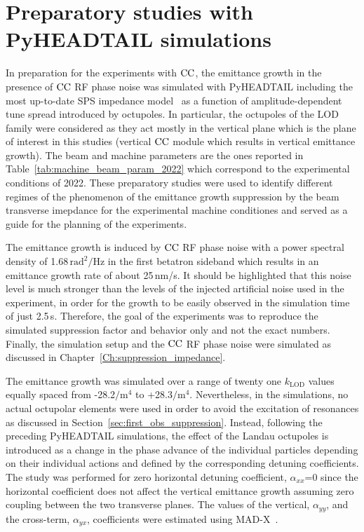 \section{Preparatory studies with PyHEADTAIL simulations}\label{sec:preparatory_studies_2022_cc}

In preparation for the experiments with ${\mathrm{CC}}$, the emittance growth in the presence of ${\mathrm{CC}}$ RF phase noise was simulated with PyHEADTAIL including the most up-to-date SPS impedance model~\cite{updated_sps_wakfields_model} as a function of amplitude-dependent tune spread introduced by octupoles. In particular, the octupoles of the LOD family were considered as they act mostly in the vertical plane which is the plane of interest in this studies (vertical ${\mathrm{CC}}$ module which results in vertical emittance growth). The beam and machine parameters are the ones reported in Table~\ref{tab:machine_beam_param_2022} which correspond to the experimental conditions of 2022. These preparatory studies were used to identify different regimes of the phenomenon of the emittance growth suppression by the beam transverse imepdance for the experimental machine conditiones and served as a guide for the planning of the experiments.

The emittance growth is induced by ${\mathrm{CC}}$ RF phase noise with a power spectral density of 1.68\,$\mathrm{rad^2/Hz}$ in the first betatron sideband which results in an emittance growth rate of about 25\,nm/s. It should be highlighted that this noise level is much stronger than the levels of the injected artificial noise used in the experiment, in order for the growth to be easily observed in the simulation time of just 2.5\,s. Therefore, the goal of the experiments was to reproduce the simulated suppression factor and behavior only and not the exact numbers. Finally, the simulation setup and the ${\mathrm{CC}}$ RF phase noise were simulated as discussed in Chapter~\ref{Ch:suppression_impedance}. 

The emittance growth was simulated over a range of twenty one $k_\mathrm{LOD}$ values equally spaced from -28.2$\mathrm{/m^4}$ to +28.3$\mathrm{/m^4}$. Nevertheless, in the simulations, no actual octupolar elements were used in order to avoid the excitation of resonances as discussed in Section~\ref{sec:first_obs_suppression}. Instead, following the preceding PyHEADTAIL simulations, the effect of the Landau octupoles is introduced as a change in the phase advance of the individual particles depending on their individual actions and defined by the corresponding detuning coefficients. The study was performed for zero horizontal detuning coefficient, $\alpha_{xx}$=0 since the horizontal coefficient does not affect the vertical emittance growth assuming zero coupling between the two transverse planes. The values of the vertical, $\alpha_{yy}$, and the cross-term, $\alpha_{yx}$, coefficients were estimated using MAD-X~\cite{madx}.

